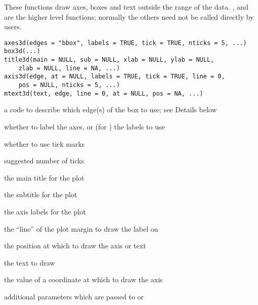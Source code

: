 \begin{Description}\relax
These functions draw axes, boxes and text outside the range of the data.
,  and  are the higher level functions; 
normally the others need not be called directly by users.
\end{Description}
\begin{Usage}
\begin{verbatim}
axes3d(edges = "bbox", labels = TRUE, tick = TRUE, nticks = 5, ...)
box3d(...) 
title3d(main = NULL, sub = NULL, xlab = NULL, ylab = NULL, 
    zlab = NULL, line = NA, ...) 
axis3d(edge, at = NULL, labels = TRUE, tick = TRUE, line = 0, 
    pos = NULL, nticks = 5, ...) 
mtext3d(text, edge, line = 0, at = NULL, pos = NA, ...) 
\end{verbatim}
\end{Usage}
\begin{Arguments}
\begin{ldescription}
\item[\code{edges}] a code to describe which edge(s) of the box to use; see Details below 
\item[\code{labels}] whether to label the axes, or (for ) the
labels to use
\item[\code{tick}] whether to use tick marks 
\item[\code{nticks}] suggested number of ticks 
\item[\code{main}] the main title for the plot 
\item[\code{sub}] the subtitle for the plot 
\item[\code{xlab, ylab, zlab}] the axis labels for the plot 
\item[\code{line}] the ``line'' of the plot margin to draw the label on 
\item[\code{edge, pos}] the position at which to draw the axis or text 
\item[\code{text}] the text to draw 
\item[\code{at}] the value of a coordinate at which to draw the axis 
\item[\code{...}] additional parameters which are passed to  or  
\end{ldescription}
\end{Arguments}

